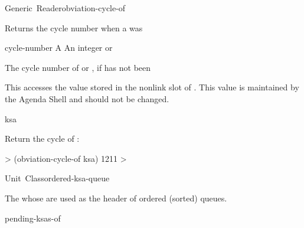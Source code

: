\documentclass[10pt,twoside,english,pdftex]{article}
\begin{document}
\begin{functiondoc}{Generic~Reader}{obviation-cycle-of}{ 
    \returns{} }
%

\fnsyntax

\fnpurpose Returns the cycle number when a  was 

\fnmethods
{}

\fnpackage {}

\fnmodule {}

\fnargs
\begin{args}{cycle-number}
\arg[ksa] A 
 An integer or \nil{}
\end{args}

\fnreturns The  cycle number of  or \nil,
if  has not been 
  
\fndescription 
This  accesses the value stored in the 
 nonlink slot of .  This value is
maintained by the Agenda Shell and should not be changed.

\begin{alsos}{ksa}
\also[ksa]
\end{alsos}

\fnexample
Return the  cycle of :
%
\W\supp
\begin{example}
  > (obviation-cycle-of ksa)
  1211
  >
\end{example}

\end{functiondoc}


\begin{functiondoc}{Unit~Class}{ordered-ksa-queue}{}
%
%

\fnsyntax

\fnpackage {}

\fnmodule {}

\fndescription The  whose  are used as
the header of ordered (sorted)  queues.

\begin{alsos}{pending-ksas-of}
\also[ksa]
\also[on-queue-p]
\also[queue]
\end{alsos}

\end{functiondoc}
\end{document}

